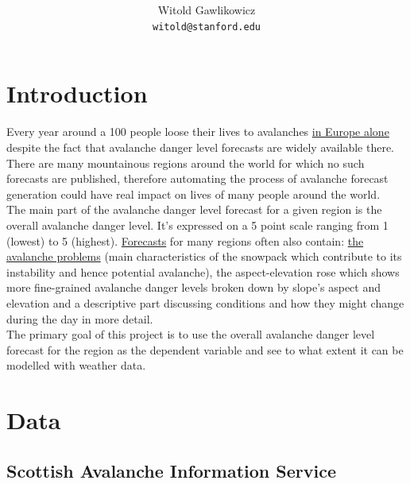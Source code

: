 \documentclass{article}
\title{ 	}
\author{
  Witold Gawlikowicz \\
  \texttt{witold@stanford.edu}
}
\newcommand{\sais}{Scottish Avalanche Information Service}
\begin{document}
\maketitle

\graphicspath{{assets/figures/}}





\section{Introduction}

	Every year around a 100 people loose their lives to avalanches \href{https://www.avalanches.org/fatalities/}{in Europe alone} despite the fact that avalanche danger level forecasts are widely available there. There are many mountainous regions around the world for which no such forecasts are published, therefore automating the process of avalanche forecast generation could have real impact on lives of many people around the world. \\

	The main part of the avalanche danger level forecast for a given region is the overall avalanche danger level. It's expressed on a 5 point scale ranging from 1 (lowest) to 5 (highest).	\href{https://www.shastaavalanche.org/page/how-read-advisory}{Forecasts} for many regions often also contain: \href{https://avalanche.state.co.us/forecasts/tutorial/avalanche-problems}{the avalanche problems} (main characteristics of the snowpack which contribute to its instability and hence potential avalanche), the aspect-elevation rose which shows more fine-grained avalanche danger levels broken down by slope's aspect and elevation and a descriptive part discussing conditions and how they might change during the day in more detail. \\
	The primary goal of this project is to use the overall avalanche danger level forecast for the region as the dependent variable and see to what extent it can be modelled with weather data.
	
\section{Data}


\subsection{\sais}\label{sec:data_sais}
\end{document}
